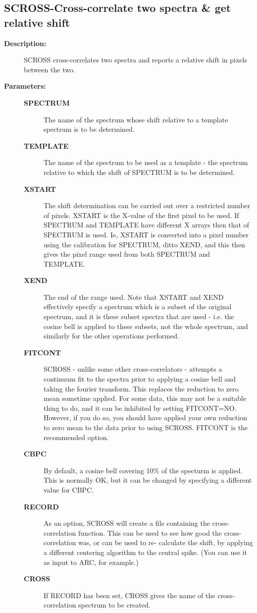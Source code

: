 \subsection{SCROSS-\label{SCROSS}Cross-correlate two spectra & get relative shift}
\begin{description}

\item [{\bf Description:}]
 SCROSS cross-correlates two spectra and reports a relative shift
 in pixels between the two.

\item [{\bf Parameters:}]
\begin{description}
\item [{\bf SPECTRUM}]
 The name of the spectrum whose shift relative
 to a template spectrum is to be determined.
\item [{\bf TEMPLATE}]
 The name of the spectrum to be used as a
 template - the spectrum relative to which the shift of
 SPECTRUM is to be determined.
\item [{\bf XSTART}]
 The shift determination can be carried out over a restricted
 number of pixels.  XSTART is the X-value of the first pixel
 to be used.  If SPECTRUM and TEMPLATE have different X arrays
 then that of SPECTRUM is used.  Ie, XSTART is converted into
 a pixel number using the calibration for SPECTRUM, ditto
 XEND, and this then gives the pixel range used from both
 SPECTRUM and TEMPLATE.
\item [{\bf XEND}]
 The end of the range used.  Note
 that XSTART and XEND effectively specify a spectrum which
 is a subset of the original spectrum, and it is these
 subset spectra that are used - i.e. the cosine bell is
 applied to these subsets, not the whole spectrum, and
 similarly for the other operations performed.
\item [{\bf FITCONT}]
 SCROSS - unlike some other cross-correlators - attempts a
 continuum fit to the spectra prior to applying a cosine
 bell and taking the fourier transform.  This replaces the
 reduction to zero mean sometime applied.  For some data,
 this may not be a suitable thing to do, and it can be
 inhibited by setting FITCONT=NO.  However, if you do
 so, you should have applied your own reduction to zero
 mean to the data prior to using SCROSS.  FITCONT is the
 recommended option.
\item [{\bf CBPC}]
 By default, a cosine bell covering 10\% of the specturm is
 applied.  This is normally OK, but it can be changed by
 specifying a different value for CBPC.
\item [{\bf RECORD}]
 As an option, SCROSS will create a file containing the
 cross-correlation function.  This can be used to see how
 good the cross-correlation was, or can be used to re-
 calculate the shift, by applying a different centering
 algorithm to the central spike.  (You can use it as
 input to ARC, for example.)
\item [{\bf CROSS}]
 If RECORD has been set, CROSS gives the name of the
 cross-correlation spectrum to be created.
\end{description}


\end{description}
